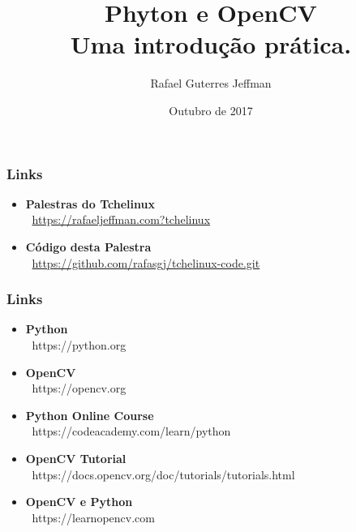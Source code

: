 

\title[]{\color{black} \textbf{Phyton e OpenCV \\ Uma introdução prática.}}
\author[]{Rafael Guterres Jeffman}
\date{Outubro de 2017}



\begin{frame}
    \titlepage
\end{frame}

\begin{frame}
    \frametitle{Links}
    \begin{itemize}
    \item\textbf{Palestras do Tchelinux} \\
        $\:$ \url{https://rafaeljeffman.com?tchelinux}
    \item\textbf{Código desta Palestra} \\
        $\:$ \url{https://github.com/rafasgj/tchelinux-code.git}
    \end{itemize}
\end{frame}

\begin{frame}
    \frametitle{Links}
    \begin{itemize}
    \item{\textbf{Python} \\ $\:$ https://python.org}
    \item{\textbf{OpenCV} \\ $\:$ https://opencv.org}
    \item{\textbf{Python Online Course} \\ $\:$ https://codeacademy.com/learn/python}
    \item{\textbf{OpenCV Tutorial} \\ $\:$ https://docs.opencv.org/doc/tutorials/tutorials.html}
    \item{\textbf{OpenCV e Python} \\ $\:$ https://learnopencv.com}
    \end{itemize}
\end{frame}


